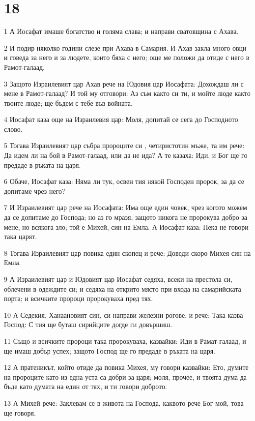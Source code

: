 \chapter{18}

\par 1 А Иосафат имаше богатство и голяма слава; и направи сватовщина с Ахава.
\par 2 И подир няколко години слезе при Ахава в Самария. И Ахав закла много овци и говеда за него и за людете, които бяха с него; още ме положи да отиде с него в Рамот-галаад.
\par 3 Защото Израилевият цар Ахав рече на Юдовия цар Иосафата: Дохождаш ли с мене в Рамот-галаад? И той му отговори: Аз съм както си ти, и мойте люде както твоите люде; ще бъдем с тебе във войната.
\par 4 Иосафат каза още на Израилевия цар: Моля, допитай се сега до Господното слово.
\par 5 Тогава Израилевият цар събра пророците си , четиристотин мъже, та им рече: Да идем ли на бой в Рамот-галаад, или да не ида? А те казаха: Иди, и Бог ще го предаде в ръката на царя.
\par 6 Обаче, Иосафат каза: Няма ли тук, освен тия някой Господен пророк, за да се допитаме чрез него?
\par 7 И Израилевият цар рече на Иосафата: Има още един човек, чрез когото можем да се допитаме до Господа; но аз го мразя, защото никога не пророкува добро за мене, но всякога зло; той е Михей, син на Емла. А Иосафат каза: Нека не говори така царят.
\par 8 Тогава Израилевият цар повика един скопец и рече: Доведи скоро Михея син на Емла.
\par 9 А Израилевият цар и Юдовият цар Иосафат седяха, всеки на престола си, облечени в одеждите си; и седяха на открито място при входа на самарийската порта; и всичките пророци пророкуваха пред тях.
\par 10 А Седекия, Ханаановият син, си направи железни рогове, и рече: Така казва Господ: С тия ще буташ сирийците догде ги довършиш.
\par 11 Също и всичките пророци така пророкуваха, казвайки: Иди в Рамат-галаад, и ще имаш добър успех; защото Господ ще го предаде в ръката на царя.
\par 12 А пратеникът, който отиде да повика Михея, му говори казвайки: Ето, думите на пророците като из една уста са добри за царя; моля, прочее, и твоята дума да бъде като думата на един от тях, и ти говори доброто.
\par 13 А Михей рече: Заклевам се в живота на Господа, каквото рече Бог мой, това ще говоря.
